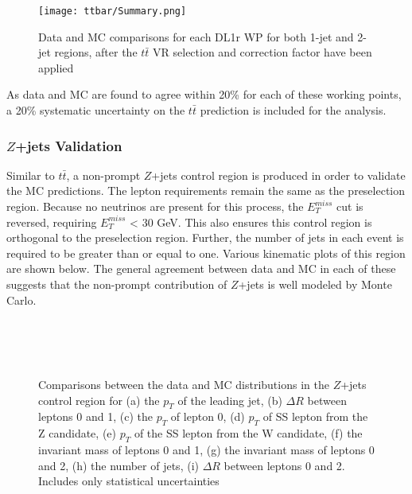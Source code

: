 \begin{figure}[H] 
   \centering
   \texttt{[image: ttbar/Summary.png]}   
   \caption{Data and MC comparisons for each DL1r WP for both 1-jet and 2-jet regions, after the $t\bar{t}$ VR selection and correction factor have been applied}
   \label{fig:ttbar_summary}
\end{figure}

As data and MC are found to agree within 20\% for each of these working points, a 20\% systematic uncertainty on the $t\bar{t}$ prediction is included for the analysis.

\subsubsection{$Z$+jets Validation}

Similar to $t\bar{t}$, a non-prompt $Z$+jets control region is produced in order to validate the MC predictions. The lepton requirements remain the same as the preselection region. Because no neutrinos are present for this process, the $E_T^{miss}$ cut is reversed, requiring $E_T^{miss}$ < 30 GeV. This also ensures this control region is orthogonal to the preselection region. Further, the number of jets in each event is required to be greater than or equal to one. Various kinematic plots of this region are shown below. The general agreement between data and MC in each of these suggests that the non-prompt contribution of $Z$+jets is well modeled by Monte Carlo.

\begin{figure}[H] 
    \\
    \\
    \\
    \caption{Comparisons between the data and MC distributions in the $Z$+jets control region for (a) the $p_T$ of the leading jet, (b) $\Delta R$ between leptons 0 and 1, (c) the $p_T$ of lepton 0, (d) $p_T$ of SS lepton from the Z candidate, (e) $p_T$ of the SS lepton from the W candidate, (f) the invariant mass of leptons 0 and 1, (g) the invariant mass of leptons 0 and 2, (h) the number of jets, (i) $\Delta R$ between leptons 0 and 2. Includes only statistical uncertainties}%
    \label{fig:zjets_noScale}
\end{figure}

